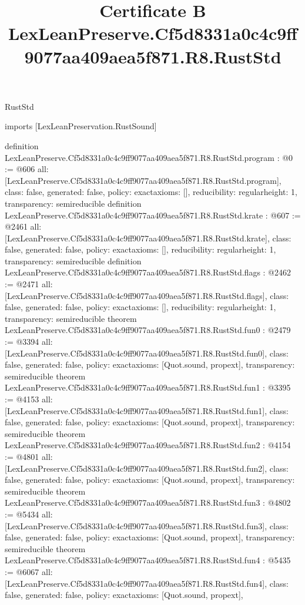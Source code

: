 \begin{lexlean}{RustStd}
\title{Certificate B LexLeanPreserve.Cf5d8331a0c4c9ff9077aa409aea5f871.R8.RustStd}
\begin{coremodule}
imports [LexLeanPreservation.RustSound]

definition LexLeanPreserve.Cf5d8331a0c4c9ff9077aa409aea5f871.R8.RustStd.program : @0 := @606 {
  all: [LexLeanPreserve.Cf5d8331a0c4c9ff9077aa409aea5f871.R8.RustStd.program],
  class: false,
  generated: false,
  policy: exact{axioms: []},
  reducibility: regular{height: 1},
  transparency: semireducible
}
definition LexLeanPreserve.Cf5d8331a0c4c9ff9077aa409aea5f871.R8.RustStd.krate : @607 := @2461 {
  all: [LexLeanPreserve.Cf5d8331a0c4c9ff9077aa409aea5f871.R8.RustStd.krate],
  class: false,
  generated: false,
  policy: exact{axioms: []},
  reducibility: regular{height: 1},
  transparency: semireducible
}
definition LexLeanPreserve.Cf5d8331a0c4c9ff9077aa409aea5f871.R8.RustStd.flags : @2462 := @2471 {
  all: [LexLeanPreserve.Cf5d8331a0c4c9ff9077aa409aea5f871.R8.RustStd.flags],
  class: false,
  generated: false,
  policy: exact{axioms: []},
  reducibility: regular{height: 1},
  transparency: semireducible
}
theorem LexLeanPreserve.Cf5d8331a0c4c9ff9077aa409aea5f871.R8.RustStd.fun0 : @2479 := @3394 {
  all: [LexLeanPreserve.Cf5d8331a0c4c9ff9077aa409aea5f871.R8.RustStd.fun0],
  class: false,
  generated: false,
  policy: exact{axioms: [Quot.sound, propext]},
  transparency: semireducible
}
theorem LexLeanPreserve.Cf5d8331a0c4c9ff9077aa409aea5f871.R8.RustStd.fun1 : @3395 := @4153 {
  all: [LexLeanPreserve.Cf5d8331a0c4c9ff9077aa409aea5f871.R8.RustStd.fun1],
  class: false,
  generated: false,
  policy: exact{axioms: [Quot.sound, propext]},
  transparency: semireducible
}
theorem LexLeanPreserve.Cf5d8331a0c4c9ff9077aa409aea5f871.R8.RustStd.fun2 : @4154 := @4801 {
  all: [LexLeanPreserve.Cf5d8331a0c4c9ff9077aa409aea5f871.R8.RustStd.fun2],
  class: false,
  generated: false,
  policy: exact{axioms: [Quot.sound, propext]},
  transparency: semireducible
}
theorem LexLeanPreserve.Cf5d8331a0c4c9ff9077aa409aea5f871.R8.RustStd.fun3 : @4802 := @5434 {
  all: [LexLeanPreserve.Cf5d8331a0c4c9ff9077aa409aea5f871.R8.RustStd.fun3],
  class: false,
  generated: false,
  policy: exact{axioms: [Quot.sound, propext]},
  transparency: semireducible
}
theorem LexLeanPreserve.Cf5d8331a0c4c9ff9077aa409aea5f871.R8.RustStd.fun4 : @5435 := @6067 {
  all: [LexLeanPreserve.Cf5d8331a0c4c9ff9077aa409aea5f871.R8.RustStd.fun4],
  class: false,
  generated: false,
  policy: exact{axioms: [Quot.sound, propext]},
}
\end{coremodule}
\end{lexlean}
